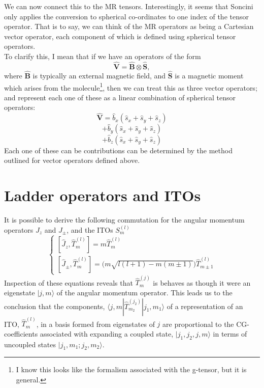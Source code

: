 \documentclass[12pt]{article}
\begin{document}
\noindent We can now connect this to the MR tensors. Interestingly,
it seems that Soncini only applies the conversion to spherical co-ordinates
to one index of the tensor operator. That is to say, we can think of the 
MR operators as being a Cartesian vector operator, 
each component of which is defined using spherical tensor operators.\\

\noindent To clarify this, I mean that if we have an operators of the form
\begin{equation}
\mathbf{\hat{V}} = \mathbf{\hat{B}}\otimes\mathbf{\hat{S}},
\end{equation}
where $\mathbf{\hat{B}}$ is typically an external
magnetic field, and $\mathbf{\hat{S}}$ is a magnetic moment
which arises from the molecule\footnote{I know
this looks like the formalism associated with the g-tensor, but
it is general.}, then we can treat this as three vector operators;
and represent each one of these as a linear combination of spherical tensor operators:
\begin{equation*}
\mathbf{\hat{V}} = \hat{b}_{x}(\hat{s}_{x}+\hat{s}_{y}+\hat{s}_{z})
\end{equation*}
\begin{equation*}
+                 \hat{b}_{y}(\hat{s}_{x}+\hat{s}_{y}+\hat{s}_{z})
\end{equation*}
\begin{equation}
+                 \hat{b}_{z}(\hat{s}_{x}+\hat{s}_{y}+\hat{s}_{z})
\end{equation}
\noindent 
\noindent Each one of these can be contributions can be determined by
the method outlined for vector operators defined above.\\

\section{Ladder operators and ITOs}
\noindent It is possible to derive the following commutation for the 
angular momentum operators $J_{z}$ and $J_{\pm}$, and the ITOs $S^{(l)}_{m}$\\
\begin{equation}
\begin{cases}
[\hat{J}_{z}, \hat{T}^{(l)}_{m} ]= m\hat{T}^{(l)}_{m}\\
[\hat{J}_{\pm}, \hat{T}^{(l)}_{m} ]= \Big(m\sqrt{l(l+1) - m(m\pm1)}\Big)\hat{T}^{(l)}_{m\pm1}
\end{cases}
\label{eqn:jtcommutation}
\end{equation}
\noindent Inspection of these equations reveals that $\hat{T}^{(j)}_{m}$ is 
behaves as though it were an eigenstate $|j,m\rangle$ of the angular momentum operator. This leads us to the conclusion that the components,
$\langle j,m| \hat{T}^{(j_{2})}_{m_{2}} | j_{1}, m_{1} \rangle$ of a representation
of an ITO, $\hat{T}^{(l)}_{m}$, in a basis  formed from eigenstates of $j$ are
proportional to the CG-coefficients associated with expanding a coupled
state, $|j_{1}, j_{2}, j,m \rangle $ in terms of uncoupled states
 $|j_{1},m_{1};j_{2},m_{2} \rangle$.\\
\end{document}
